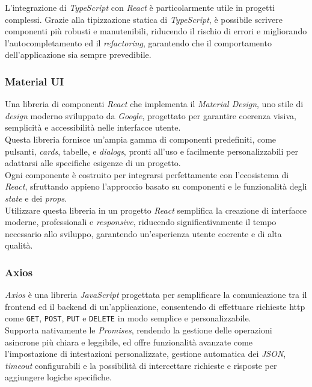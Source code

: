 \noindent L’integrazione di \textit{TypeScript} con \textit{React} è particolarmente utile in progetti complessi.
Grazie alla tipizzazione statica di \textit{TypeScript}, è possibile scrivere componenti più robusti e manutenibili, riducendo il rischio di errori e migliorando l’autocompletamento ed il \textit{refactoring},
garantendo che il comportamento dell’applicazione sia sempre prevedibile. \\

\subsubsection{Material UI}
Una libreria di componenti \textit{React} che implementa il \textit{Material Design}, uno stile di \textit{design} moderno sviluppato da \textit{Google}, progettato per garantire coerenza visiva, semplicità e accessibilità nelle interfacce utente.\\

\noindent Questa libreria fornisce un’ampia gamma di componenti predefiniti, come pulsanti, \textit{cards}, tabelle, e \textit{dialogs}, pronti all’uso e facilmente personalizzabili per adattarsi alle specifiche esigenze di un progetto. \\
Ogni componente è costruito per integrarsi perfettamente con l’ecosistema di \textit{React}, sfruttando appieno l’approccio basato su componenti e le funzionalità degli \textit{state} e dei \textit{props}.\\

\noindent Utilizzare questa libreria in un progetto \textit{React} semplifica la creazione di interfacce moderne, professionali e \textit{responsive}, riducendo significativamente il tempo necessario allo sviluppo, garantendo un’esperienza utente coerente e di alta qualità.\\

\subsubsection{Axios}

\textit{Axios} è una libreria \textit{JavaScript} progettata per semplificare la comunicazione tra il \gls{frontend} ed il \gls{backend} di un’applicazione, consentendo di effettuare richieste \gls{http} come \texttt{GET}, \texttt{POST}, \texttt{PUT} e \texttt{DELETE} in modo semplice e personalizzabile. \\
Supporta nativamente le \textit{Promises}, rendendo la gestione delle operazioni asincrone più chiara e leggibile, ed offre funzionalità avanzate come l’impostazione di intestazioni personalizzate, gestione automatica dei \textit{JSON},
\textit{timeout} configurabili e la possibilità di intercettare richieste e risposte per aggiungere logiche specifiche.\\


